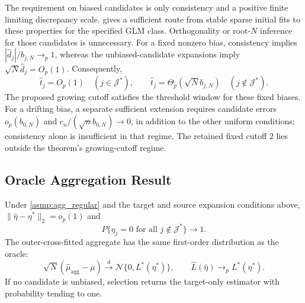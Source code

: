 \documentclass[12pt]{article}
\begin{document}
The requirement on biased candidates is only consistency and a positive finite limiting discrepancy scale.  gives a sufficient route from stable sparse initial fits to these properties for the specified GLM class. Orthogonality or root-$N$ inference for those candidates is unnecessary. For a fixed nonzero bias, consistency implies $|\widehat d_j|/b_{j,N}\to_p1$, whereas the unbiased-candidate expansions imply $\sqrt{N}\widehat d_j=O_p(1)$. Consequently,
\[
\widehat t_j=O_p(1)\quad(j\in\mathcal J^*),\qquad
\widehat t_j=\Theta_p(\sqrt{N}b_{j,N})\quad(j\notin\mathcal J^*).
\]
The proposed growing cutoff satisfies the threshold window for these fixed biases. For a drifting bias, a separate sufficient extension requires candidate errors $o_p(b_{0,N})$ and $c_n/(\sqrt n b_{0,N})\to0$, in addition to the other uniform conditions; consistency alone is insufficient in that regime. The retained fixed cutoff $2$ lies outside the theorem's growing-cutoff regime.

\subsection{Oracle Aggregation Result}\label{supp:aggregation_main_results}
\begin{theorem}\label{thm:agg_face_hd}
Under \cref{asmp:agg_regular} and the target and source expansion conditions above, $\|\widehat\eta-\eta^*\|_2=o_p(1)$ and
\[
P\{\widehat\eta_j=0\text{ for all }j\notin\mathcal J^*\}\longrightarrow1.
\]
The outer-cross-fitted aggregate has the same first-order distribution as the oracle:
\[
\sqrt{N}(\widehat\mu_{\mathrm{agg}}-\mu)
\xrightarrow{d}\mathcal N\{0,L^*(\eta^*)\},
\qquad \widehat L(\widehat\eta)\to_p L^*(\eta^*).
\]
If no candidate is unbiased, selection returns the target-only estimator with probability tending to one.
\end{theorem}

\end{document}
